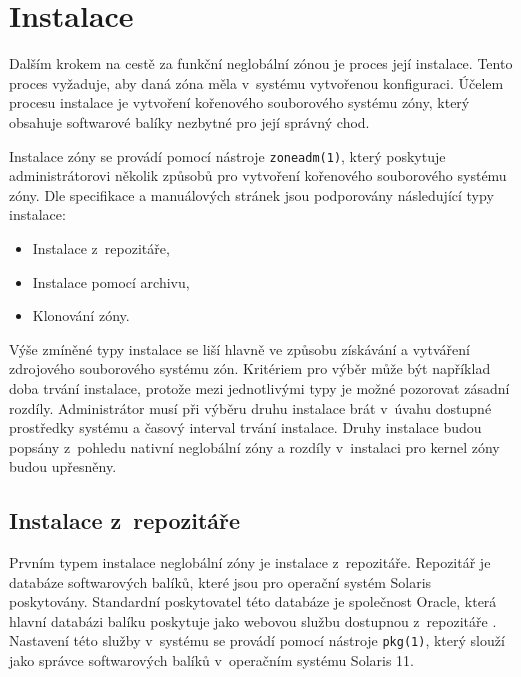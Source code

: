 \section{Instalace}
\label{chapter:zones:instalation}
Dalším krokem na cestě za funkční neglobální zónou je proces její instalace. Tento proces vyžaduje, aby daná zóna měla
v~systému vytvořenou konfiguraci. Účelem procesu instalace je vytvoření kořenového souborového systému zóny, který obsahuje
softwarové balíky nezbytné pro její správný chod.

Instalace zóny se provádí pomocí nástroje \verb|zoneadm(1)|, který poskytuje administrátorovi několik způsobů
pro vytvoření kořenového souborového systému zóny. Dle specifikace \cite{oracle:solaris:zones:installation} a manuálových stránek
\cite{oracle:manpages:zoneadm} jsou podporovány následující typy instalace:
\begin{itemize}
 \item Instalace z~repozitáře,
 \item Instalace pomocí archivu,
 \item Klonování zóny.
\end{itemize}
Výše zmíněné typy instalace se liší hlavně ve způsobu získávání a vytváření zdrojového souborového systému zón. Kritériem pro
výběr může být například doba trvání instalace, protože mezi jednotlivými typy je možné pozorovat zásadní rozdíly. Administrátor
musí při výběru druhu instalace brát v~úvahu dostupné prostředky systému a časový interval trvání instalace. Druhy instalace
budou popsány z~pohledu nativní neglobální zóny a rozdíly v~instalaci pro kernel zóny budou upřesněny. 
\subsection{Instalace z~repozitáře}
\label{chapter:zones:instalation:repozitory}
Prvním typem instalace neglobální zóny je instalace z~repozitáře. Repozitář je databáze softwarových balíků, které jsou pro 
operační systém Solaris poskytovány. Standardní poskytovatel této databáze je společnost Oracle, která hlavní databázi balíku
poskytuje jako webovou službu dostupnou z~repozitáře \cite{oracle:solaris:desing:pkg_repository}. Nastavení této služby v~systému
se provádí pomocí nástroje \verb|pkg(1)|, který slouží jako správce softwarových balíků v~operačním systému Solaris 11.

